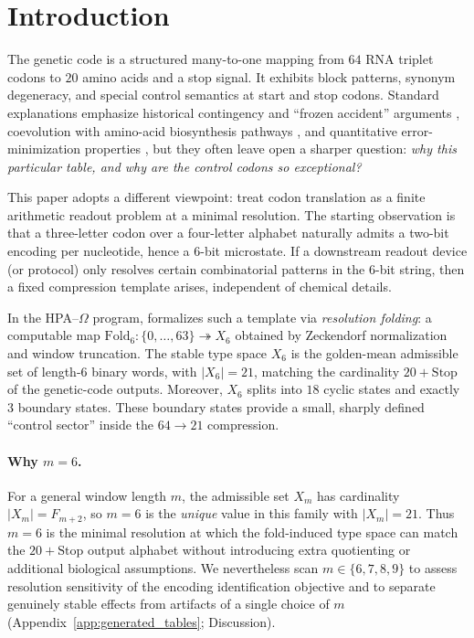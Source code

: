 \section{Introduction}
\label{sec:introduction}

The genetic code is a structured many-to-one mapping from $64$ RNA triplet codons to $20$ amino acids and a stop signal.
It exhibits block patterns, synonym degeneracy, and special control semantics at start and stop codons.
Standard explanations emphasize historical contingency and ``frozen accident'' arguments \cite{Crick1968}, coevolution with amino-acid biosynthesis pathways \cite{Wong1975}, and quantitative error-minimization properties \cite{HaigHurst1991}, but they often leave open a sharper question:
\emph{why this particular table, and why are the control codons so exceptional?}

This paper adopts a different viewpoint: treat codon translation as a finite arithmetic readout problem at a minimal resolution.
The starting observation is that a three-letter codon over a four-letter alphabet naturally admits a two-bit encoding per nucleotide, hence a $6$-bit microstate.
If a downstream readout device (or protocol) only resolves certain combinatorial patterns in the $6$-bit string, then a fixed compression template arises, independent of chemical details.

In the HPA--$\Omega$ program, \cite{Ma2025RF} formalizes such a template via \emph{resolution folding}: a computable map $\mathrm{Fold}_6:\{0,\dots,63\}\twoheadrightarrow X_6$ obtained by Zeckendorf normalization and window truncation.
The stable type space $X_6$ is the golden-mean admissible set of length-$6$ binary words, with $|X_6|=21$, matching the cardinality $20+\mathrm{Stop}$ of the genetic-code outputs.
Moreover, $X_6$ splits into $18$ cyclic states and exactly $3$ boundary states.
These boundary states provide a small, sharply defined ``control sector'' inside the $64\to 21$ compression.

\paragraph{Why $m=6$.}
For a general window length $m$, the admissible set $X_m$ has cardinality $|X_m|=F_{m+2}$, so $m=6$ is the \emph{unique} value in this family with $|X_m|=21$.
Thus $m=6$ is the minimal resolution at which the fold-induced type space can match the $20+\mathrm{Stop}$ output alphabet without introducing extra quotienting or additional biological assumptions.
We nevertheless scan $m\in\{6,7,8,9\}$ to assess resolution sensitivity of the encoding identification objective and to separate genuinely stable effects from artifacts of a single choice of $m$ (Appendix~\ref{app:generated_tables}; Discussion).

